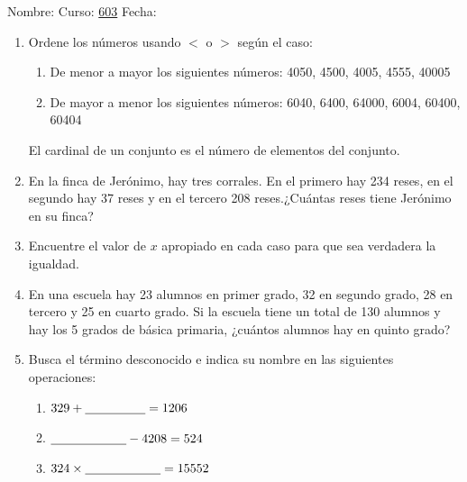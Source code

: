 \documentclass[fleqn]{article}
\newcommand{\LineaNombre}{%
\par
\vspace{\baselineskip}
Nombre:\hrulefill \; Curso: \underline{603} \; Fecha: \underline{\hspace*{2.5cm}} \relax
\par}
\begin{document}
\LineaNombre
\begin{enumerate}
   \item Ordene los números usando $<$ o $>$ según el caso: 
      \begin{enumerate}
	 \item De menor a mayor los siguientes números: 4050, 4500, 4005, 4555, 40005\answer
	 \item De mayor a menor los siguientes números: 6040, 6400, 64000, 6004, 60400, 60404\answer
      \end{enumerate}
   El cardinal de un conjunto es el número de elementos del conjunto.
  \item En la finca de Jerónimo, hay tres corrales. En el primero hay 234 reses, en el segundo hay 37 reses y en el tercero 208 reses.¿Cuántas reses tiene Jerónimo en su finca?\noanswer
  \item Encuentre el valor de $x$ apropiado en cada caso para que sea verdadera la igualdad.
  \begin{enumerate}
  \end{enumerate}
  \item En una escuela hay 23 alumnos en primer grado, 32 en segundo grado, 28 en tercero y 25 en cuarto grado. Si la escuela tiene un total de 130 alumnos y hay los 5 grados de básica primaria, ¿cuántos alumnos hay en quinto grado? \noanswer
   \item Busca el término desconocido e indica su nombre en las siguientes operaciones:
   \begin{enumerate}
   \item $329+\underline{\hspace*{48pt}}=1206$\noanswer
   \item $\underline{\hspace*{60pt}}-4208=524$\noanswer
   \item $324\times \underline{\hspace*{60pt}}=15552 $\noanswer
   \end{enumerate}
\end{enumerate}
\end{document}
